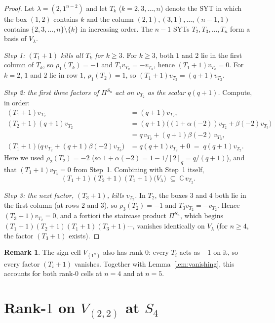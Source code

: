 \documentclass[11pt]{article}
\theoremstyle{definition}
\newtheorem{remark}[theorem]{Remark}
\newcommand{\Pis}[1]{\Pi^{S_{#1}}}
\begin{document}
\begin{proof}
Let $\lambda = (2,1^{n-2})$ and let $T_k$ ($k = 2,3,\ldots,n$) denote the
SYT in which the box $(1,2)$ contains $k$ and the column $(2,1),(3,1),\ldots,(n-1,1)$
contains $\{2,3,\ldots,n\}\setminus\{k\}$ in increasing order. The $n-1$
SYTs $T_2, T_3,\ldots,T_n$ form a basis of $V_\lambda$.

\emph{Step 1: $(T_1+1)$ kills all $T_k$ for $k \ge 3$.}
For $k \ge 3$, both $1$ and $2$ lie in the first column of $T_k$, so
$\rho_1(T_k) = -1$ and $T_1 v_{T_k} = -v_{T_k}$, hence $(T_1+1)v_{T_k}=0$.
For $k=2$, $1$ and $2$ lie in row $1$, $\rho_1(T_2) = 1$, so
$(T_1+1)v_{T_2} = (q+1)v_{T_2}$.

\emph{Step 2: the first three factors of $\Pis{n}$ act on $v_{T_2}$ as the
scalar $q(q+1)$.} Compute, in order:
\begin{align*}
(T_1+1)v_{T_2} &= (q+1)v_{T_2}, \\
(T_2+1)(q+1)v_{T_2} &= (q+1)\bigl((1+\alpha(-2))v_{T_2} + \beta(-2)v_{T_3}\bigr) \\
  &= q\, v_{T_2} + (q+1)\beta(-2)\, v_{T_3}, \\
(T_1+1)\bigl(q\,v_{T_2} + (q+1)\beta(-2)v_{T_3}\bigr)
  &= q(q+1)v_{T_2} + 0 \;=\; q(q+1)v_{T_2}.
\end{align*}
Here we used $\rho_2(T_2) = -2$ (so $1+\alpha(-2) = 1 - 1/[2]_q = q/(q+1)$),
and that $(T_1+1)v_{T_3}=0$ from Step~1. Combining with Step~1 itself,
\[
(T_1+1)(T_2+1)(T_1+1)\bigl(V_\lambda\bigr) \;\subseteq\; \mathbb{C}\, v_{T_2}.
\]

\emph{Step 3: the next factor, $(T_3+1)$, kills $v_{T_2}$.} In $T_2$, the
boxes $3$ and $4$ both lie in the first column (at rows $2$ and $3$), so
$\rho_3(T_2) = -1$ and $T_3 v_{T_2} = -v_{T_2}$. Hence
$(T_3+1)v_{T_2}=0$, and a fortiori the staircase product $\Pis{n}$,
which begins $(T_1+1)(T_2+1)(T_1+1)(T_3+1)\cdots$, vanishes identically on
$V_\lambda$ (for $n \ge 4$, the factor $(T_3+1)$ exists). \qedhere
\end{proof}

\begin{remark}
The sign cell $V_{(1^n)}$ also has rank $0$: every $T_i$ acts as $-1$ on it,
so every factor $(T_i+1)$ vanishes. Together with Lemma~\ref{lem:vanishing},
this accounts for both rank-$0$ cells at $n=4$ and at $n=5$.
\end{remark}

\section{Rank-$1$ on $V_{(2,2)}$ at $S_4$}\label{sec:V22}
\end{document}

